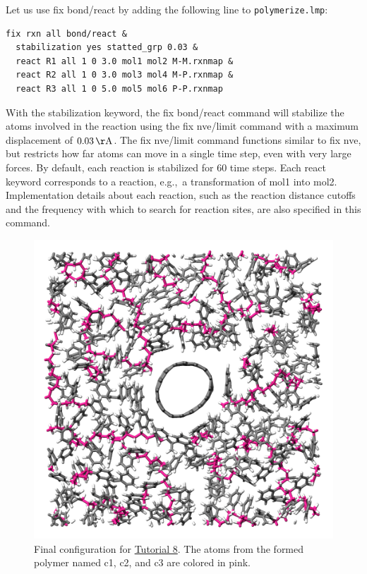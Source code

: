 \documentclass[9pt,tutorial]{livecoms}
\newcommand{\lmpcmd}[1]{\colorbox{listing}{\textcolor{command}{\small{#1}}}} %
\newcommand{\flecmd}[1]{\textcolor{command}{\texttt{#1}}} %
\begin{document}
Let us use \lmpcmd{fix bond/react} by adding the following
line to \flecmd{polymerize.lmp}:
\begin{lstlisting}
fix rxn all bond/react &
  stabilization yes statted_grp 0.03 &
  react R1 all 1 0 3.0 mol1 mol2 M-M.rxnmap &
  react R2 all 1 0 3.0 mol3 mol4 M-P.rxnmap &
  react R3 all 1 0 5.0 mol5 mol6 P-P.rxnmap
\end{lstlisting}
With the \lmpcmd{stabilization} keyword, the \lmpcmd{fix bond/react} command will
stabilize the atoms involved in the reaction using the \lmpcmd{fix nve/limit}
command with a maximum displacement of $0.03\,\mathrm{\AA{}}$.
The \lmpcmd{fix nve/limit} command functions similar to
\lmpcmd{fix nve}, but restricts how far atoms can move in a single time step, even with
very large forces.
By default, each reaction is stabilized for 60 time steps.  Each \lmpcmd{react} keyword
corresponds to a reaction, e.g.,~a transformation of \lmpcmd{mol1} into \lmpcmd{mol2}. 
Implementation details about each reaction, such as the reaction distance cutoffs
and the frequency with which to search for reaction sites, are also specified in this command.

\begin{figure}
\centering
\includegraphics[width=\linewidth]{REACT-final.png}
\caption{Final configuration for \hyperref[bond-react-label]{Tutorial 8}.
The atoms from the formed polymer named \lmpcmd{c1}, \lmpcmd{c2}, and
\lmpcmd{c3} are colored in pink.}
\label{fig:REACT-final}
\end{figure}
\end{document}
